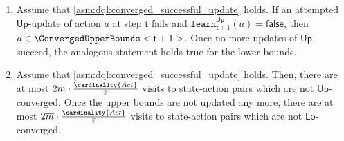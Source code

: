 \documentclass{theoretics}
\newcommand{\lfalse}{\mathsf{false}}
\newcommand{\Actions}{Act}
\newcommand{\upperbound}{\mathsf{Up}}
\newcommand{\lowerbound}{\mathsf{Lo}}
\newcommand{\updatestep}{{\overline{\varepsilon}}}
\newcommand{\delay}{{\overline{m}}}
\newcommand{\learn}{\texttt{learn}}
\newcommand{\algostep}{\mathsf{t}}
\begin{document}
\begin{lemma}
\begin{enumerate}
		\item \label{item:stm:dql:properties:unsuccessful_update_means_converged}
		Assume that \cref{asm:dql:converged_successful_update} holds.
		If an attempted $\upperbound$-update  of action $a$ at step $\algostep$ fails and $\learn^\upperbound_{\algostep+1}(a) = \lfalse$, then $a \in \ConvergedUpperBounds<\algostep+1>$.
		Once no more updates of $\upperbound$ succeed, the analogous statement holds true for the lower bounds.

		\item \label{item:stm:dql:properties:non_converged_visit_count}
		Assume that \cref{asm:dql:converged_successful_update} holds.
		Then, there are at most $2 \delay \cdot \frac{\cardinality{\Actions}}{\updatestep}$ visits to state-action pairs which are not $\upperbound$-converged.
		Once the upper bounds are not updated any more, there are at most $2 \delay \cdot \frac{\cardinality{\Actions}}{\updatestep}$ visits to state-action pairs which are not $\lowerbound$-converged.
	\end{enumerate}
\end{lemma}
\end{document}
